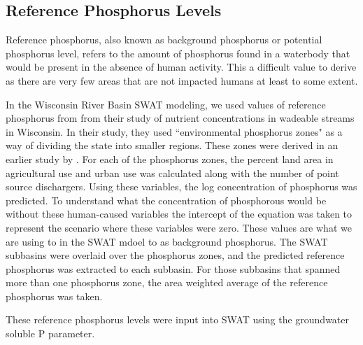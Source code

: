 \subsection{Reference Phosphorus Levels}
	Reference phosphorus, also known as background phosphorus or potential phosphorus level, refers to the amount of phosphorus found in a waterbody that would be present in the absence of human activity. This a difficult value to derive as there are very few areas that are not impacted humans at least to some extent. 
	
	In the Wisconsin River Basin SWAT modeling, we used values of reference phosphorus from \citet{robertson_wadeable_2006} from their study of nutrient concentrations in wadeable streams in Wisconsin. In their study, they used ``environmental phosphorus zones" as a way of dividing the state into smaller regions. These zones were derived in an earlier study by \citet{robertson_phosphoruszones_2006}. 
	For each of the phosphorus zones, the percent land area in agricultural use and urban use was calculated along with the number of point source dischargers. Using these variables, the log concentration of phosphorus was predicted. To understand what the concentration of phosphorous would be without these human-caused variables the intercept of the equation was taken to represent the scenario where these variables were zero. These values are what we are using to in the SWAT mdoel to as background phosphorus. The SWAT subbasins were overlaid over the phosphorus zones, and the predicted reference phosphorus was extracted to each subbasin. For those subbasins that spanned more than one phosphorus zone, the area weighted average of the reference phosphorus was taken.
	
	These reference phosphorus levels were input into SWAT using the groundwater soluble P parameter.